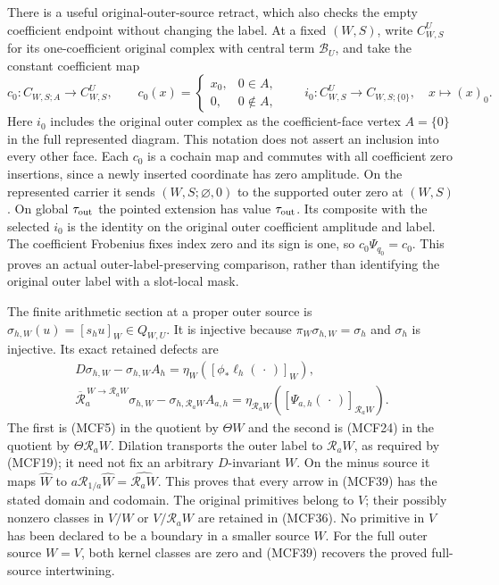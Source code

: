 There is a useful original-outer-source retract, which also checks the
empty coefficient endpoint without changing the label.  At a fixed
$(W,S)$, write $C_{W,S}^U$ for its one-coefficient original complex
with central term $\mathscr B_U$, and take the constant coefficient map
\[
c_0:C_{W,S;A}\longrightarrow C_{W,S}^U,\qquad
c_0(x)=\begin{cases}x_0,&0\in A,\\0,&0\notin A,
\end{cases}
\qquad
i_0:C_{W,S}^U\longrightarrow C_{W,S;\{0\}},\quad x\longmapsto(x)_0.
\tag{MCF38}
\]
Here $i_0$ includes the original outer complex as the coefficient-face
vertex $A=\{0\}$ in the full represented diagram.  This notation does
not assert an inclusion into every other face.  Each $c_0$ is a cochain
map and commutes with all coefficient zero insertions, since a newly
inserted coordinate has zero amplitude.  On the represented carrier
it sends $(W,S;\varnothing,0)$ to the supported outer zero at
$(W,S)$.  On global $\tau_{\rm out}$ the pointed extension
has value $\tau_{\rm out}$.  Its composite with the selected $i_0$
is the identity on the original outer coefficient amplitude and label.
The coefficient Frobenius fixes index zero and its sign is one, so
$c_0\Psi_{q_0}=c_0$.  This proves an actual outer-label-preserving
comparison, rather than identifying the original outer label with a
slot-local mask.

The finite arithmetic section at a proper outer source is
$\sigma_{h,W}(u)=[s_hu]_W\in Q_{W,U}$.  It is injective because
$\pi_W\sigma_{h,W}=\sigma_h$ and $\sigma_h$ is injective.
Its exact retained defects are
\[
\begin{gathered}
D\sigma_{h,W}-\sigma_{h,W}A_h
       =\eta_W([\phi_*\ell_h(\,\cdot\,)]_W),\\
\overline{\mathcal R}_a^{\,W\to\mathcal R_aW}\sigma_{h,W}
       -\sigma_{h,\mathcal R_aW}A_{a,h}
       =\eta_{\mathcal R_aW}([\Psi_{a,h}(\,\cdot\,)]_{\mathcal R_aW}).
\end{gathered}
\tag{MCF39}
\]
The first is (MCF5) in the quotient by $\Theta W$ and the second is
(MCF24) in the quotient by $\Theta\mathcal R_aW$.  Dilation transports
the outer label to $\mathcal R_aW$, as required by (MCF19); it need
not fix an arbitrary $D$-invariant $W$.  On the minus source it maps
$\widehat W$ to $a\mathcal R_{1/a}\widehat W=
\widehat{\mathcal R_aW}$.  This proves that every arrow in (MCF39)
has the stated domain and codomain.  The original primitives belong
to $V$; their possibly nonzero classes in $V/W$ or
$V/\mathcal R_aW$ are retained in (MCF36).  No primitive in $V$ has
been declared to be a boundary in a smaller source $W$.
For the full outer source $W=V$, both kernel classes are zero and
(MCF39) recovers the proved full-source intertwining.

